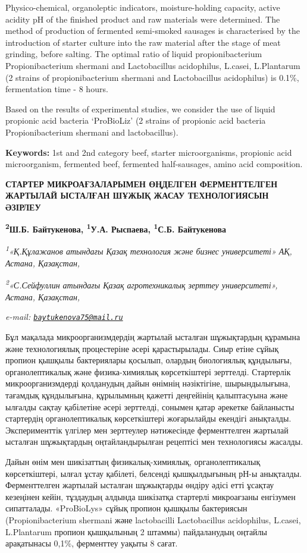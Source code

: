Physico-chemical, organoleptic indicators, moisture-holding capacity,
active acidity pH of the finished product and raw materials were
determined. The method of production of fermented semi-smoked sausages
is characterised by the introduction of starter culture into the raw
material after the stage of meat grinding, before salting. The optimal
ratio of liquid propionibacterium Propionibacterium shermani and
Lactobacillus acidophilus, L.casei, L.Plantarum (2 strains of
propionibacterium shermani and Lactobacillus acidophilus) is 0.1\%,
fermentation time - 8 hours.

Based on the results of experimental studies, we consider the use of
liquid propionic acid bacteria `ProBioLiz' (2 strains of propionic acid
bacteria Propionibacterium shermani and lactobacillus).

{\bfseries Keywords:} 1st and 2nd category beef, starter microorganisms,
propionic acid microorganism, fermented beef, fermented half-sausages,
amino acid composition.

{\bfseries СТАРТЕР МИКРОАҒЗАЛАРЫМЕН ӨҢДЕЛГЕН ФЕРМЕНТТЕЛГЕН ЖАРТЫЛАЙ
ЫСТАЛҒАН ШҰЖЫҚ ЖАСАУ ТЕХНОЛОГИЯСЫН ӘЗІРЛЕУ}

{\bfseries \textsuperscript{2}Ш.Б. Байтукенова\textsuperscript{\envelope },
\textsuperscript{1}У.А. Рыспаева, \textsuperscript{1}С.Б. Байтукенова}

\emph{\textsuperscript{1}«Қ.Құлажанов атындағы Қазақ технология және
бизнес университеті» АҚ, Астана, Қазақстан,}

\emph{\textsuperscript{2}«С.Сейфуллин атындағы Қазақ агротехникалық
зерттеу университеті», Астана, Қазақстан,}

\emph{e-mail:
\href{mailto:baytukenova75@mail.ru}{\nolinkurl{baytukenova75@mail.ru}}}

Бұл мақалада микроорганизмдердің жартылай ысталған шұжықтардың құрамына
және технологиялық процестеріне әсері қарастырылады. Сиыр етіне сұйық
пропион қышқылы бактериялары қосылып, олардың биологиялық құндылығы,
органолептикалық және физика-химиялық көрсеткіштері зерттелді.
Стартерлік микроорганизмдерді қолданудың дайын өнімнің нәзіктігіне,
шырындылығына, тағамдық құндылығына, құрылымның қажетті деңгейінің
қалыптасуына және ылғалды сақтау қабілетіне әсері зерттелді, сонымен
қатар әрекетке байланысты стартердің органолептикалық көрсеткіштері
жоғарылайды екендігі анықталды. Эксперименттік үлгілер мен зерттеулер
нәтижесінде ферменттелген жартылай ысталған шұжықтардың оңтайландырылған
рецептісі мен технологиясы жасалды.

Дайын өнім мен шикізаттың физикалық-химиялық, органолептикалық
көрсеткіштері, ылғал ұстау қабілеті, белсенді қышқылдығының рН-ы
анықталды. Ферменттелген жартылай ысталған шұжықтарды өндіру әдісі етті
ұсақтау кезеңінен кейін, тұздаудың алдында шикізатқа стартерлі
микроағзаны енгізумен сипатталады. «ProBioLys» сұйық пропион қышқылы
бактериясын (Propionibacterium shermani және lactobacilli Lactobacillus
acidophilus, L.casei, L.Plantarum пропион қышқылының 2 штаммы)
пайдаланудың оңтайлы арақатынасы 0,1\%, ферменттеу уақыты 8 сағат.

